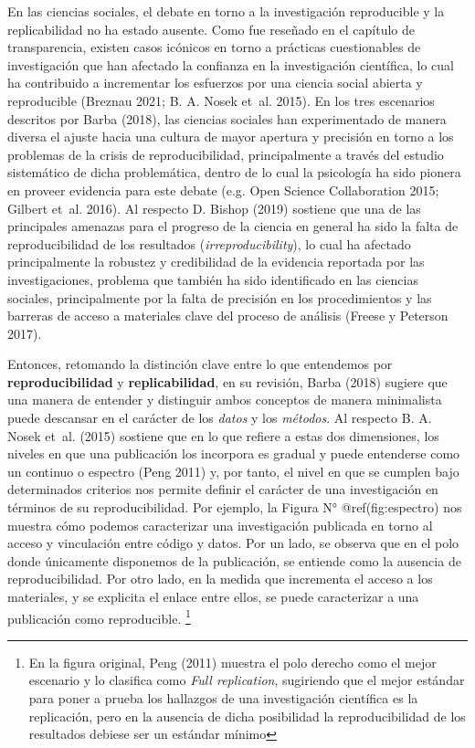 \documentclass[
  spanish,
  letterpaper,
  DIV=11,
  numbers=noendperiod]{scrreprt}
\begin{document}
En las ciencias sociales, el debate en torno a la investigación
reproducible y la replicabilidad no ha estado ausente. Como fue reseñado
en el capítulo de transparencia, existen casos icónicos en torno a
prácticas cuestionables de investigación que han afectado la confianza
en la investigación científica, lo cual ha contribuido a incrementar los
esfuerzos por una ciencia social abierta y reproducible (Breznau 2021;
B. A. Nosek et~al. 2015). En los tres escenarios descritos por Barba
(2018), las ciencias sociales han experimentado de manera diversa el
ajuste hacia una cultura de mayor apertura y precisión en torno a los
problemas de la crisis de reproducibilidad, principalmente a través del
estudio sistemático de dicha problemática, dentro de lo cual la
psicología ha sido pionera en proveer evidencia para este debate (e.g.
Open Science Collaboration 2015; Gilbert et~al. 2016). Al respecto D.
Bishop (2019) sostiene que una de las principales amenazas para el
progreso de la ciencia en general ha sido la falta de reproducibilidad
de los resultados (\emph{irreproducibility}), lo cual ha afectado
principalmente la robustez y credibilidad de la evidencia reportada por
las investigaciones, problema que también ha sido identificado en las
ciencias sociales, principalmente por la falta de precisión en los
procedimientos y las barreras de acceso a materiales clave del proceso
de análisis (Freese y Peterson 2017).

Entonces, retomando la distinción clave entre lo que entendemos por
\textbf{reproducibilidad} y \textbf{replicabilidad}, en su revisión,
Barba (2018) sugiere que una manera de entender y distinguir ambos
conceptos de manera minimalista puede descansar en el carácter de los
\emph{datos} y los \emph{métodos}. Al respecto B. A. Nosek et~al. (2015)
sostiene que en lo que refiere a estas dos dimensiones, los niveles en
que una publicación los incorpora es gradual y puede entenderse como un
continuo o espectro (Peng 2011) y, por tanto, el nivel en que se cumplen
bajo determinados criterios nos permite definir el carácter de una
investigación en términos de su reproducibilidad. Por ejemplo, la Figura
N° @ref(fig:espectro) nos muestra cómo podemos caracterizar una
investigación publicada en torno al acceso y vinculación entre código y
datos. Por un lado, se observa que en el polo donde únicamente
disponemos de la publicación, se entiende como la ausencia de
reproducibilidad. Por otro lado, en la medida que incrementa el acceso a
los materiales, y se explicita el enlace entre ellos, se puede
caracterizar a una publicación como reproducible. \footnote{En la figura
  original, Peng (2011) muestra el polo derecho como el mejor escenario
  y lo clasifica como \emph{Full replication}, sugiriendo que el mejor
  estándar para poner a prueba los hallazgos de una investigación
  científica es la replicación, pero en la ausencia de dicha posibilidad
  la reproducibilidad de los resultados debiese ser un estándar mínimo}
\end{document}
